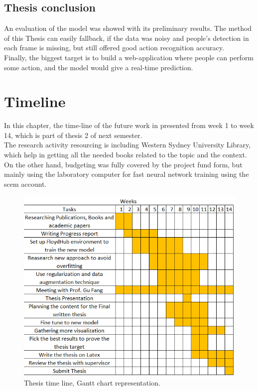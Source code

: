 \subsection{Thesis conclusion}
\hspace{5mm} An evaluation of the model was showed with its preliminary results. The method of this Thesis can easily fallback, if the data was noisy and people's detection in each frame is missing, but still offered good action recognition accuracy.\\
Finally, the biggest target is to build a web-application where people can perform some action, and the model would give a real-time prediction.\\
\section{Timeline}
\hspace{5mm} In this chapter, the time-line of the future work in presented from week 1 to week 14, which is part of thesis 2 of next semester.\\

The research activity resourcing is including Western Sydney University Library, which help in getting all the needed books related to the topic and the context. On the other hand, budgeting was fully covered by the project fund form, but mainly using the laboratory computer for fast neural network training using the scem account.
\begin{figure}[ht]
    \centering
    \includegraphics{Figures/fc.PNG}
    \decoRule
    \caption [Thesis time line, Gantt chart representation.]{Thesis time line, Gantt chart representation.}
    \label{fig:la}
    \end{figure}\hfill \\

